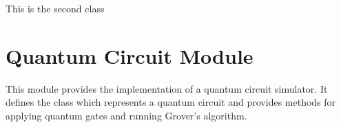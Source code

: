 \documentclass[letterpaper,10pt,english]{sphinxmanual}
\begin{document}

\begin{fulllineitems}
\label{\detokenize{index:example.Example2}}
\pysigstartsignatures
{}
\pysigstopsignatures
\sphinxAtStartPar
This is the second class

\end{fulllineitems}


\chapter{Quantum Circuit Module}
\label{\detokenize{index:quantum-circuit-module}}\label{\detokenize{index:module-qc}}
\sphinxAtStartPar
This module provides the implementation of a quantum circuit simulator.
It defines the  class which represents a quantum circuit and
provides methods for applying quantum gates and running Grover’s algorithm.
\end{document}
